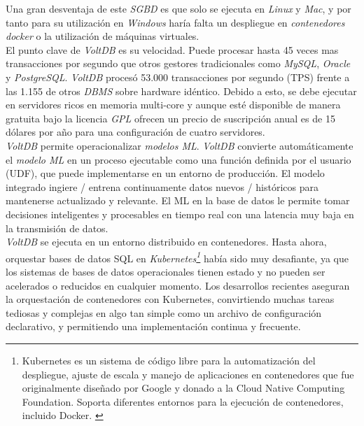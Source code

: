 \documentclass[11pt,a4paper]{article}
\begin{document}
Una gran desventaja de este \emph{SGBD} es que solo se ejecuta en \emph{Linux} y \emph{Mac}, y por tanto para su utilización en \emph{Windows} haría falta un despliegue en \emph{contenedores docker} o la utilización de máquinas virtuales. \cite{VOLT:4} \\

El punto clave de \emph{VoltDB} es su velocidad. Puede procesar hasta 45 veces mas transacciones por segundo que otros gestores tradicionales como \emph{MySQL}, \emph{Oracle} y \emph{PostgreSQL}. \emph{VoltDB} procesó 53.000 transacciones por segundo (TPS) frente a las 1.155 de otros \emph{DBMS} sobre hardware idéntico. \cite{VOLT:5} Debido a esto, se debe ejecutar en servidores ricos en memoria multi-core y aunque esté disponible de manera gratuita bajo la licencia \emph{GPL} ofrecen un precio de suscripción anual es de 15 dólares por año para una configuración de cuatro servidores.\\

\emph{VoltDB} permite operacionalizar \emph{modelos ML}. \emph{VoltDB} convierte automáticamente el \emph{modelo ML} en un proceso ejecutable como una función definida por el usuario (UDF), que puede implementarse en un entorno de producción. El modelo integrado ingiere / entrena continuamente datos nuevos / históricos para mantenerse actualizado y relevante. El ML en la base de datos le permite tomar decisiones inteligentes y procesables en tiempo real con una latencia muy baja en la transmisión de datos. \cite{VOLT:6}\\

\emph{VoltDB} se ejecuta en un entorno distribuido en contenedores. Hasta ahora, orquestar bases de datos SQL en \emph{Kubernetes\footnote{Kubernetes es un sistema de código libre para la automatización del despliegue, ajuste de escala y manejo de aplicaciones en contenedores que fue originalmente diseñado por Google y donado a la Cloud Native Computing Foundation. Soporta diferentes entornos para la ejecución de contenedores, incluido Docker. \cite{VOLT:7}}} había sido muy desafiante, ya que los sistemas de bases de datos operacionales tienen estado y no pueden ser acelerados o reducidos en cualquier momento. Los desarrollos recientes aseguran la orquestación de contenedores con Kubernetes, convirtiendo muchas tareas tediosas y complejas en algo tan simple como un archivo de configuración declarativo, y permitiendo una implementación continua y frecuente. \cite{VOLT:6}\\

\newpage


\end{document}
